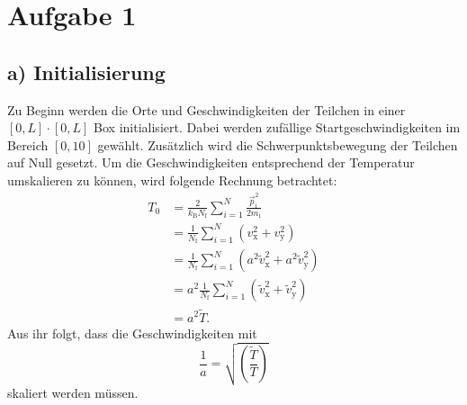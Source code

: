 \section*{Aufgabe 1}


\subsection*{a) Initialisierung}

Zu Beginn werden die Orte und Geschwindigkeiten der Teilchen in einer $[0,L] \cdot [0,L]$ Box initialisiert.
Dabei werden zufällige Startgeschwindigkeiten im Bereich \([0, 10]\) gewählt.
Zusätzlich wird die Schwerpunktsbewegung der Teilchen auf Null gesetzt.
Um die Geschwindigkeiten entsprechend der Temperatur umskalieren zu können, wird folgende Rechnung betrachtet:
\begin{align*}
    T_0 &=
    \frac{2}{k_\text{B} N_\text{f}} \sum_{i=1}^N \frac{\vec{p}_\text{i}^2}{2 m_\text{i}} \\
    &= \frac{1}{N_\text{f}} \sum_{i=1}^N \left(v_\text{x}^2 + v_\text{y}^2\right) \\
    &= \frac{1}{N_\text{f}} \sum_{i=1}^N
        \left(a^2 \tilde{v}_\text{x}^2 + a^2 \tilde{v}_\text{y}^2\right) \\
    &= a^2 \frac{1}{N_\text{f}} \sum_{i=1}^N
        \left(\tilde{v}_\text{x}^2 + \tilde{v}_\text{y}^2\right) \\
    &= a^2 \tilde{T}.
\end{align*}
Aus ihr folgt, dass die Geschwindigkeiten mit
\begin{equation*}
    \frac{1}{a} = \sqrt{\!\left(\frac{\tilde{T}}{T}\right)}
\end{equation*}
skaliert werden müssen.

